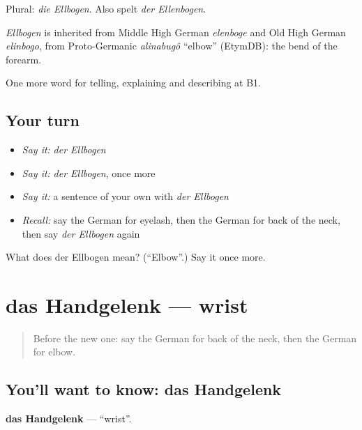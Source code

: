 Plural: \emph{die Ellbogen}. Also spelt \emph{der Ellenbogen}.

\begin{cousinweb}
\emph{Ellbogen} is inherited from Middle High German \emph{elenboge} and Old High German \emph{elinbogo}, from Proto-Germanic \emph{alinabugô} \textquotedblleft{}elbow\textquotedblright{} (EtymDB): the bend of the forearm.
\end{cousinweb}

\begin{grammarlens}[title={What you've built}]
One more word for telling, explaining and describing at B1.
\end{grammarlens}

\subsection*{Your turn}
\begin{itemize}
\raggedright
  \item \emph{Say it:} \emph{der Ellbogen}
  \item \emph{Say it:} \emph{der Ellbogen}, once more
  \item \emph{Say it:} a sentence of your own with \emph{der Ellbogen}
  \item \emph{Recall:} say the German for eyelash, then the German for back of the neck, then say \emph{der Ellbogen} again
\end{itemize}

\begin{tcolorbox}[breakable,colback=teal!4,colframe=teal!35!black,title={Before you move on}]
What does der Ellbogen mean? (\textquotedblleft{}Elbow\textquotedblright{}.) Say it once more.
\end{tcolorbox}
\section[das Handgelenk]{das Handgelenk — wrist}

\label{lesson:GE-C485-handgelenk}



\begin{quote}
Before the new one: say the German for back of the neck, then the German for elbow.
\end{quote}

\subsection*{You'll want to know: das Handgelenk}
\textbf{das Handgelenk} — \textquotedblleft{}wrist\textquotedblright{}.

